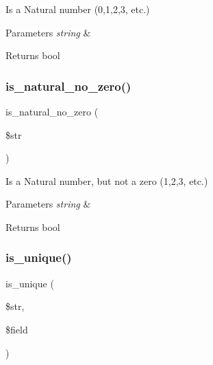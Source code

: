 Is a Natural number (0,1,2,3, etc.)


\begin{DoxyParams}{Parameters}
{\em string} & \\
\hline
\end{DoxyParams}
\begin{DoxyReturn}{Returns}
bool 
\end{DoxyReturn}
\mbox{\label{class_c_i___form__validation_ae4f399db6305e565bcf9acd70eea86a6}} 
\subsubsection{\texorpdfstring{is\+\_\+natural\+\_\+no\+\_\+zero()}{is\_natural\_no\_zero()}}
{\footnotesize\ttfamily is\+\_\+natural\+\_\+no\+\_\+zero (\begin{DoxyParamCaption}\item[{}]{\$str }\end{DoxyParamCaption})}

Is a Natural number, but not a zero (1,2,3, etc.)


\begin{DoxyParams}{Parameters}
{\em string} & \\
\hline
\end{DoxyParams}
\begin{DoxyReturn}{Returns}
bool 
\end{DoxyReturn}
\mbox{\label{class_c_i___form__validation_a1a5ee6b60f419248ca8796444aea3a78}} 
\subsubsection{\texorpdfstring{is\+\_\+unique()}{is\_unique()}}
{\footnotesize\ttfamily is\+\_\+unique (\begin{DoxyParamCaption}\item[{}]{\$str,  }\item[{}]{\$field }\end{DoxyParamCaption})}

